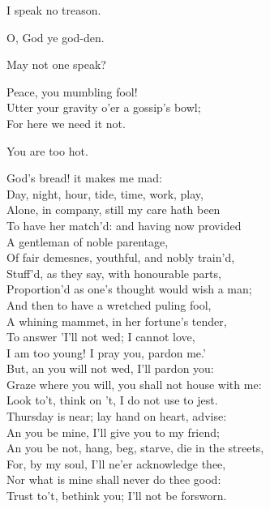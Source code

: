\begin{speech}
I speak no treason. \\
\end{speech}
\begin{speech}
O, God ye god-den. \\
\end{speech}
\begin{speech}
May not one speak? \\
\end{speech}
\begin{speech}
Peace, you mumbling fool! \\
Utter your gravity o'er a gossip's bowl; \\
For here we need it not. \\
\end{speech}
\begin{speech}
You are too hot. \\
\end{speech}
\begin{speech}
God's bread! it makes me mad: \\
Day, night, hour, tide, time, work, play, \\
Alone, in company, still my care hath been \\
To have her match'd: and having now provided \\
A gentleman of noble parentage, \\
Of fair demesnes, youthful, and nobly train'd, \\
Stuff'd, as they say, with honourable parts, \\
Proportion'd as one's thought would wish a man; \\
And then to have a wretched puling fool, \\
A whining mammet, in her fortune's tender, \\
To answer 'I'll not wed; I cannot love, \\
I am too young! I pray you, pardon me.' \\
But, an you will not wed, I'll pardon you: \\
Graze where you will, you shall not house with me: \\
Look to't, think on 't, I do not use to jest. \\
Thursday is near; lay hand on heart, advise: \\
An you be mine, I'll give you to my friend; \\
An you be not, hang, beg, starve, die in the streets, \\
For, by my soul, I'll ne'er acknowledge thee, \\
Nor what is mine shall never do thee good: \\
Trust to't, bethink you; I'll not be forsworn.  \\
\end{speech}
